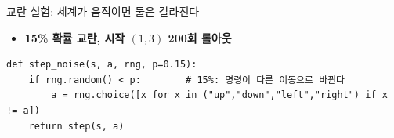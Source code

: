 \begin{frame}[fragile]{교란 실험: 세계가 움직이면 둘은 갈라진다}
  \begin{itemize}
    
    
    \item \textbf{15\% 확률 교란, 시작 $(1,3)$ 200회 롤아웃}
  \end{itemize}
\begin{lstlisting}
def step_noise(s, a, rng, p=0.15):
    if rng.random() < p:        # 15%: 명령이 다른 이동으로 바뀐다
        a = rng.choice([x for x in ("up","down","left","right") if x != a])
    return step(s, a)
\end{lstlisting}

\end{frame}
